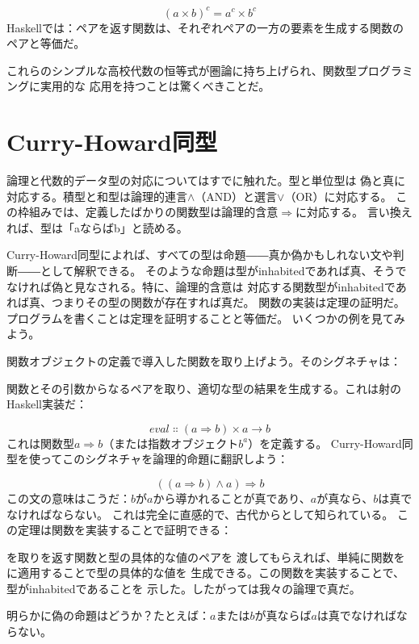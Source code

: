 \[(a \times b)^{c} = a^{c} \times b^{c}\]
Haskellでは：ペアを返す関数は、それぞれペアの一方の要素を生成する関数のペアと等価だ。

これらのシンプルな高校代数の恒等式が圏論に持ち上げられ、関数型プログラミングに実用的な
応用を持つことは驚くべきことだ。

\section{Curry-Howard同型}

論理と代数的データ型の対応についてはすでに触れた。型と単位型\code{()}は
偽と真に対応する。積型と和型は論理的連言$\wedge$（AND）と選言$\vee$（OR）に対応する。
この枠組みでは、定義したばかりの関数型は論理的含意$\Rightarrow$に対応する。
言い換えれば、型は「aならばb」と読める。

Curry-Howard同型によれば、すべての型は命題――真か偽かもしれない文や判断――として解釈できる。
そのような命題は型がinhabitedであれば真、そうでなければ偽と見なされる。特に、論理的含意は
対応する関数型がinhabitedであれば真、つまりその型の関数が存在すれば真だ。
関数の実装は定理の証明だ。プログラムを書くことは定理を証明することと等価だ。
いくつかの例を見てみよう。

関数オブジェクトの定義で導入した関数を取り上げよう。そのシグネチャは：

関数とその引数からなるペアを取り、適切な型の結果を生成する。これは射のHaskell実装だ：

\[\mathit{eval} \Colon (a \Rightarrow b) \times a \to b\]
これは関数型$a \Rightarrow b$（または指数オブジェクト$b^{a}$）を定義する。
Curry-Howard同型を使ってこのシグネチャを論理的命題に翻訳しよう：

\[((a \Rightarrow b) \wedge a) \Rightarrow b\]
この文の意味はこうだ：$b$が$a$から導かれることが真であり、$a$が真なら、$b$は真でなければならない。
これは完全に直感的で、古代からとして知られている。
この定理は関数を実装することで証明できる：

を取りを返す関数と型の具体的な値のペアを
渡してもらえれば、単純に関数をに適用することで型の具体的な値を
生成できる。この関数を実装することで、型がinhabitedであることを
示した。したがっては我々の論理で真だ。

明らかに偽の命題はどうか？たとえば：$a$または$b$が真ならば$a$は真でなければならない。

